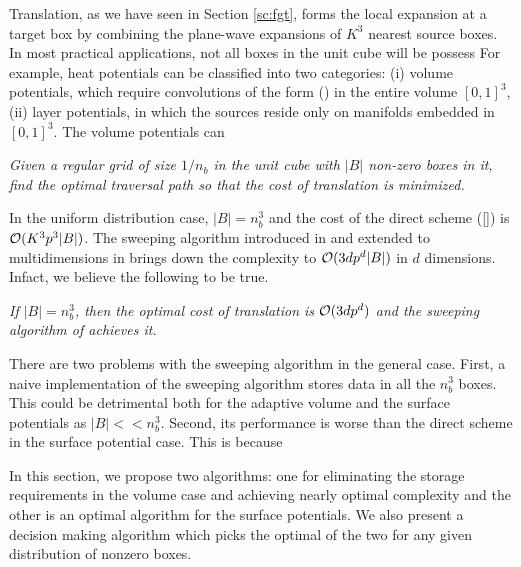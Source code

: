 Translation, as we have seen in Section \ref{sc:fgt}, forms the local expansion at a target box by combining the plane-wave expansions of $K^3$ nearest source boxes. In most practical applications, not all boxes in the unit cube will be possess 
 For example, heat potentials can be classified into two categories: (i) volume potentials, which require convolutions of the form () in the entire volume $[0, 1]^3$, (ii) layer potentials, in which the sources reside only on manifolds embedded in $[0, 1]^3$. The volume potentials can 
% 
\begin{prob}
{\em Given a regular grid of size $1/n_b$ in the unit cube with $|B|$ non-zero boxes in it, find the optimal traversal path so that the cost of translation is minimized.
}
\end{prob}
%
In the uniform distribution case, $|B| = n_b^3$ and the cost of the direct scheme (\ref{}) is $\mathcal{O}(K^3 p^3 |B|)$. The sweeping algorithm introduced in \cite{greengard98} and extended to multidimensions in \cite{fggt} brings down the complexity to $\mathcal{O}(3dp^d |B|)$ in $d$ dimensions. Infact, we believe the following to be true. 

\begin{conj}
{\em If $|B| = n_b^3$, then the optimal cost of translation is $\mathcal{O}(3 d p^d)$ and the sweeping algorithm of \cite{greengard98} achieves it.}
\end{conj}

There are two problems with the sweeping algorithm in the general case.  
First, a naive implementation of the sweeping algorithm stores data in all the $n_b^3$ boxes. This could be detrimental both for the adaptive volume and the surface potentials as $|B| << n_b^3$. Second, its performance is worse than the direct scheme in the surface potential case. This is because 


In this section, we propose two algorithms: one for eliminating the storage requirements in the volume case and achieving nearly optimal complexity and the other is an optimal algorithm for the surface potentials. We also present a decision making algorithm which picks the optimal of the two for any given distribution of nonzero boxes. 


